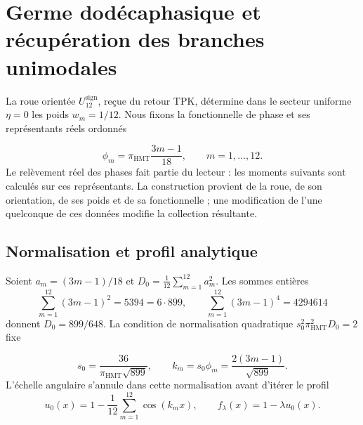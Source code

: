\section{Germe dodécaphasique et récupération des branches unimodales
}
\label{corpus9:iv:germen}

La roue orientée \(U_{12}^{\mathrm{sign}}\), reçue du retour
TPK, détermine dans le secteur uniforme \(\eta=0\) les poids
\(w_m=1/12\). Nous fixons la fonctionnelle de phase et ses représentants
réels ordonnés

\begin{equation}
 \phi_m=\pi_{\mathrm{HMT}}\frac{3m-1}{18},
 \qquad m=1,\ldots,12.
 \label{corpus9:iv:germen-fases}
\end{equation}
Le relèvement réel des phases fait partie du lecteur :
les moments suivants sont calculés sur ces représentants.
La construction provient de la roue, de son orientation, de ses poids
et de sa fonctionnelle ; une modification de l’une quelconque de ces données
modifie la collection résultante.

\subsection{Normalisation et profil analytique}
Soient \(a_m=(3m-1)/18\) et
\(D_0=\frac1{12}\sum_{m=1}^{12}a_m^2\). Les sommes entières
\[
 \sum_{m=1}^{12}(3m-1)^2=5394=6\cdot899,\qquad
 \sum_{m=1}^{12}(3m-1)^4=4294614
\]
donnent \(D_0=899/648\). La condition de normalisation quadratique
\(s_0^2\pi_{\mathrm{HMT}}^2D_0=2\) fixe

\[
 s_0=\frac{36}{\pi_{\mathrm{HMT}}\sqrt{899}},
 \qquad k_m=s_0\phi_m=\frac{2(3m-1)}{\sqrt{899}}.
\]
L’échelle angulaire s’annule dans cette normalisation avant
d’itérer le profil
\begin{equation}
 u_0(x)=1-\frac1{12}\sum_{m=1}^{12}\cos(k_mx),
 \qquad f_\lambda(x)=1-\lambda u_0(x).
 \label{corpus9:iv:germen-perfil}
\end{equation}

